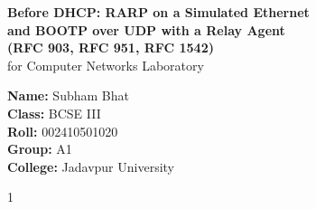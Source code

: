 \documentclass[11pt,a4paper]{article}
\begin{document}
\begin{titlepage}
    \centering
    \vspace*{4.2cm}

    {\LARGE \textbf{Before DHCP: RARP on a Simulated Ethernet}}\\[0.7em]
    {\LARGE \textbf{and BOOTP over UDP with a Relay Agent}}\\[0.7em]
    {\LARGE \textbf{(RFC 903, RFC 951, RFC 1542)}}\\[1.4em]

    {\large for Computer Networks Laboratory}

    \vspace{3.8cm}

    {\large
    \textbf{Name:} Subham Bhat\\[0.55em]
    \textbf{Class:} BCSE III\\[0.55em]
    \textbf{Roll:} 002410501020\\[0.55em]
    \textbf{Group:} A1\\[0.55em]
    \textbf{College:} Jadavpur University
    }

    \vfill
    {\normalsize 1}
\end{titlepage}

\setcounter{page}{2}
\tableofcontents
\newpage

\setcounter{page}{3}
\end{document}
